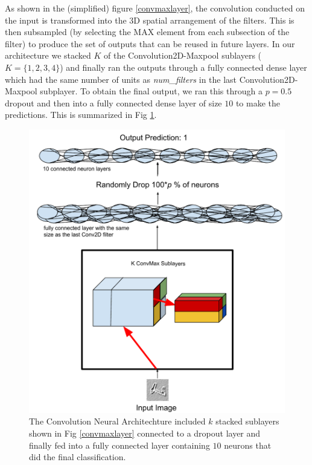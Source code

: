 \documentclass[conference]{IEEEtran}
\begin{document}
As shown in the (simplified) figure \ref{convmaxlayer}, the convolution conducted on the input is transformed into the 3D spatial arrangement of the filters. This is then subsampled (by selecting the MAX element from each subsection of the filter) to produce the set of outputs that can be reused in future layers. In our architecture we stacked $K$ of the Convolution2D-Maxpool sublayers ($K=\{1,2,3,4\}$) and finally ran the outputs through a fully connected dense layer which had the same number of units as \emph{num\_filters} in the last Convolution2D-Maxpool subplayer. To obtain the final output, we ran this through a $p=0.5$ dropout and then into a fully connected dense layer of size $10$ to make the predictions. This is summarized in Fig \ref{CNNarch}. 

\begin{figure}[h]
	\includegraphics[scale=0.5]{architecture.pdf}
	\caption{The Convolution Neural Architechture included $k$ stacked sublayers shown in Fig \ref{convmaxlayer} connected to a dropout layer and finally fed into a fully connected layer containing $10$ neurons that did the final classification.}
	\label{CNNarch}
\end{figure}
\end{document}
